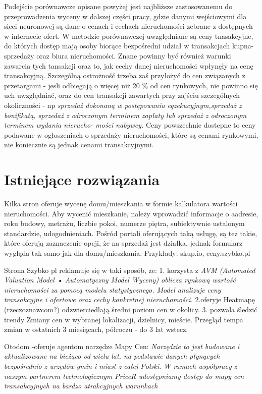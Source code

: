 \documentclass[a4paper,12pt,twoside,openany]{report}
\begin{document}
\begin{itemize}
Podejście porównawcze opisane powyżej jest najbliższe zastosowanemu do przeprowadzenia wyceny w dalszej części pracy, gdzie danymi wejściowymi dla sieci neuronowej są dane o  cenach i cechach nieruchomości zebrane z dostępnych w internecie ofert. 
W metodzie porównawczej uwzględniane są ceny tnasakcyjne, do których dostęp mają osoby biorące bezpośredni udział w transakcjach kupna-sprzedaży oraz biura nieruchomości. Znane powinny być również warunki zawarcia tych tansakcji  oraz to, jak cechy danej nieruchomości wpłynęły na cenę transakcyjną. Szczególną ostrożność trzeba zaś przyłożyć do cen związanych z przetargami - jesli odbiegają o więcej niż 20 \% od cen rynkowych, nie powinno się uch uwzględniać, oraz do cen transakcji zawartych przy zajściu szczególnych okoliczności - np \textit{sprzedaż dokonaną w postępowaniu egzekucyjnym,sprzedaż z bonifikatą, sprzedaż z odroczonym terminem zapłaty lub sprzedaż z odroczonym terminem wydania nierucho-
mości nabywcy.}
Ceny powszechnie dostepne to ceny podawane w ogłoszeniach o sprzedaży nieruchomości, które są cenami rynkowymi, nie koniecznie są jednak cenami transakcyjnymi.

\end {itemize}

\section {Istniejące rozwiązania}
Kilka stron oferuje wycenę domu/mieszkania w formie kalkulatora wartości nieruchomości. Aby wycenić mieszkanie, należy wprowadzić informacje o aadresie, roku budowy, metrażu, liczbie pokoi, numerze piętra, subiektywnie ustalonym standardzie, udogodnieniach. Pośród portali oferujących taką usługę, są też takie, które oferują zaznaczenie opcji, że na sprzedaż jest działka, jednak formularz wygląda tak samo jak dla domu/mieszkania.
Przykłady: skup.io, ceny.szybko.pl 

 Strona Szybko pl reklamuje się w taki sposób, ze:
 1. korzysta z 
\textit {AVM (Automated Valuation Model • Automatyczny Model Wyceny) oblicza rynkową wartość nieruchomości za pomocą modelu statystycznego. Model analizuje ceny transakcyjne i ofertowe oraz cechy konkretnej nieruchomości. }
2.oferyje Heatmapę (rzeczoznawcom?) odzwierciedlają średni poziom cen w okolicy. 
3. pozwala śledzić trendy
Zmiany cen w wybranej lokalizacji, dzielnicy, mieście. Przegląd tempa zmian w ostatnich 3 miesiącach, półroczu - do 3 lat wstecz. 


Otodom -oferuje agentom narzędze Mapy Cen:
\textit{Narzędzie to jest budowane i aktualizowane na bieżąco od wielu lat, na podstawie danych płynących bezpośrednio z urzędów gmin i miast z całej Polski. W ramach współpracy z naszym partnerem technologicznym PriceR udostępniamy dostęp do mapy cen transakcyjnych na bardzo atrakcyjnych warunkach}
\end{document}
